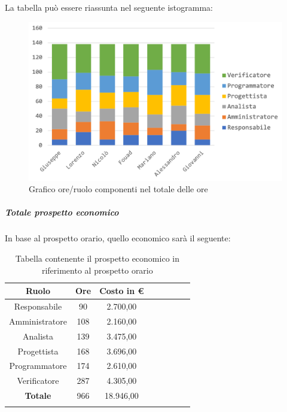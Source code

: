 			La tabella può essere riassunta nel seguente istogramma:
			\begin{figure}[H]
				\centering
				\includegraphics[width=0.8\linewidth]{./images/preventivo/totOre1.png}
				\caption{Grafico ore/ruolo componenti nel totale delle ore}
				\label{fig:grafico suddivione ruoli totale ore}
			\end{figure}
			
			\subparagraph{Totale prospetto economico}
			In base al prospetto orario, quello economico sarà il seguente: 
			
			\begin{longtable}{|c|c|c|c|c|c|c|c|}
				\hline
				\rowcolor{lighter-grayer}
				\textbf{Ruolo} & \textbf{Ore} & \textbf{Costo in € } \\
				\hline
				\endfirsthead
				
				\hline
				Responsabile 	    & 90 & 2.700,00\\
				\hline 
				\hline
				Amministratore	  & 108 & 2.160,00\\
				\hline
				\hline
				Analista 				& 139 & 3.475,00\\
				\hline
				\hline
				Progettista 		  & 168 & 3.696,00\\
				\hline
				\hline
				Programmatore 	 & 174 & 2.610,00\\
				\hline
				\hline
				Verificatore 		  & 287 & 4.305,00\\
				\hline
				\textbf{Totale} 	& 966 & 18.946,00\\
				\hline
				\caption{Tabella contenente il prospetto economico in riferimento al prospetto orario}
			\end{longtable}
			\pagebreak
			
